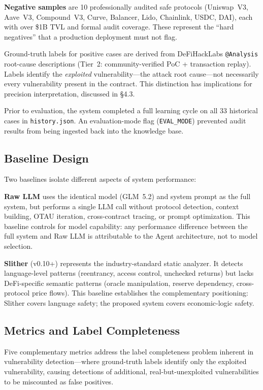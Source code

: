 \documentclass[10pt]{article}
\begin{document}
\textbf{Negative samples} are 10 professionally audited safe protocols (Uniswap~V3, Aave~V3, Compound~V3, Curve, Balancer, Lido, Chainlink, USDC, DAI), each with over \$1B TVL and formal audit coverage. These represent the ``hard negatives'' that a production deployment must not flag.

Ground-truth labels for positive cases are derived from DeFiHackLabs \texttt{@Analysis} root-cause descriptions (Tier~2: community-verified PoC + transaction replay). Labels identify the \emph{exploited} vulnerability---the attack root cause---not necessarily every vulnerability present in the contract. This distinction has implications for precision interpretation, discussed in \S4.3.

Prior to evaluation, the system completed a full learning cycle on all 33 historical cases in \texttt{history.json}. An evaluation-mode flag (\texttt{EVAL\_MODE}) prevented audit results from being ingested back into the knowledge base.

\subsection{Baseline Design}
Two baselines isolate different aspects of system performance:

\textbf{Raw LLM} uses the identical model (GLM~5.2) and system prompt as the full system, but performs a single LLM call without protocol detection, context building, OTAU iteration, cross-contract tracing, or prompt optimization. This baseline controls for model capability: any performance difference between the full system and Raw LLM is attributable to the Agent architecture, not to model selection.

\textbf{Slither} (v0.10+) represents the industry-standard static analyzer. It detects language-level patterns (reentrancy, access control, unchecked returns) but lacks DeFi-specific semantic patterns (oracle manipulation, reserve dependency, cross-protocol price flows). This baseline establishes the complementary positioning: Slither covers language safety; the proposed system covers economic-logic safety.

\subsection{Metrics and Label Completeness}
Five complementary metrics address the label completeness problem inherent in vulnerability detection---where ground-truth labels identify only the exploited vulnerability, causing detections of additional, real-but-unexploited vulnerabilities to be miscounted as false positives.
\end{document}
